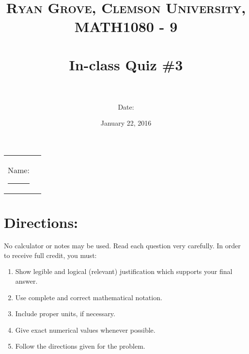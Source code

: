 \documentclass[paper=a4, fontsize=11pt]{scrartcl} %
\title{	
\normalfont \normalsize 
\textsc{Ryan Grove, Clemson University, MATH1080 - 9} \\ [25pt] %
\horrule{0.5pt} \\[0.4cm] %
\huge In-class Quiz \#3 \\ %
\horrule{2pt} \\[0.5cm] %
}
\author{Date:} %
\date{\normalsize January 22, 2016} %
\numberwithin{equation}{section} %
\numberwithin{figure}{section} %
\numberwithin{table}{section} %
\begin{document}
\maketitle %

\begin{flushleft}
\begin{tabular}{l l}
Name: \rule{3.2in}{.01cm}  & {}%
\end{tabular}
\end{flushleft}


\section*{\textbf{Directions:}}

No calculator or notes may be used.  Read each question very carefully.  In order to receive full credit, you must:
\begin{enumerate}
\item Show legible and logical (relevant) justification which supports your final answer.
\item Use complete and correct mathematical notation.
\item Include proper units, if necessary.
\item Give exact numerical values whenever possible.
\item Follow the directions given for the problem.
\end{enumerate}
\vspace{.1in}

\newpage
\end{document}
